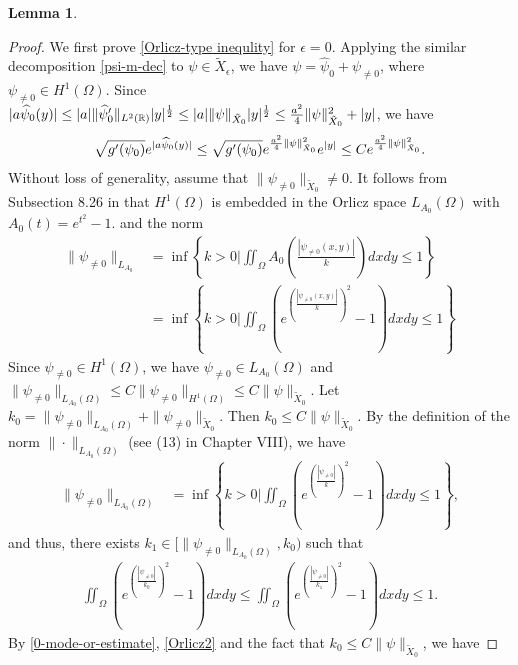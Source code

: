 \documentclass[1 [leqno, 11pt]{amsart}
\numberwithin{equation}{section}
\let\ep=\epsilon
\newtheorem{lemma}[Theorem]{Lemma}
\begin{document}
\begin{CJK*}{GBK}{song}
\begin{lemma}
\end{lemma}
\begin{proof} We first prove \eqref{Orlicz-type inequlity} for $\ep=0$.
Applying the similar decomposition \eqref{psi-m-dec} to $\psi \in \tilde{X}_\ep$, we have $\psi = \widehat\psi_0 +\psi_{\neq0}$, where
 $\psi_{\neq0} \in H^1(\Omega)$. Since $|a\widehat\psi_0(y)| \leq|a|\|\widehat\psi_0'\|_{L^2(\mathbb{R})}|y|^{\frac 1 2}\leq |a|\|\psi\|_{\tilde{X}_0}|y|^{\frac 1 2}\leq{a^2\over4}\|\psi\|_{\tilde{X}_0}^2+|y|$, we have
\begin{align}\label{0-mode-or-estimate}
\sqrt{g'(\psi_0)} e^{|a\widehat\psi_0(y)|} \leq \sqrt{g'(\psi_0)} e^{{a^2\over4}\|\psi\|_{\tilde{X}_0}^2 } e^{|y|} \leq C e^{{a^2\over4}\|\psi\|_{\tilde{X}_0}^2 }. \end{align}
Without loss of generality, assume that $\|\psi_{\neq0}\|_{\tilde{X}_0} \neq 0$. It follows from Subsection 8.26 in \cite{Adams75} that $H^1(\Omega)$ is embedded in the Orlicz space $L_{A_0}(\Omega)$ with $A_0(t) = e^{t^2} - 1$.
and the norm
\begin{align*}
\|\psi_{\neq0}\|_{L_{A_0}} &= \inf \left \{ k > 0 | \iint_{\Omega} A_0(\frac{|\psi_{\neq0}(x,y)|}{k}) dx dy \leq 1 \right \} \\
&= \inf \left \{ k > 0 | \iint_{\Omega} \left( e^{\left (\frac{|\psi_{\neq0}(x,y)|}{k}\right)^2} - 1\right)dx dy \leq 1 \right \}
\end{align*}
\fi
Since $\psi_{\neq0} \in H^1(\Omega)$, we have
   $\psi_{\neq0} \in L_{A_0}(\Omega)$ and
$\|\psi_{\neq0}\|_{L_{A_0}(\Omega)} \leq C \|\psi_{\neq0}\|_{H^1(\Omega)} \leq C \|\psi\|_{\tilde{X}_0}.$
Let $k_0 = \|\psi_{\neq0}\|_{L_{A_0}(\Omega)} + \|\psi_{\neq0}\|_{\tilde{X}_0}$. Then $k_0 \leq C\|\psi\|_{\tilde{X}_0}$. By the definition of the norm $\|\cdot\|_{L_{A_0}(\Omega)}$ (see (13) in Chapter VIII), we have
\begin{align*}
\|\psi_{\neq0}\|_{L_{A_0}(\Omega)}
&= \inf \left \{ k > 0 \bigg| \iint_{\Omega} \left( e^{\left (\frac{|\psi_{\neq0}|}{k}\right)^2} - 1\right)dx dy \leq 1 \right \},
\end{align*}
and thus, there exists $k_1\in[\|\psi_{\neq0}\|_{L_{A_0}(\Omega)}, k_0)$ such that
\begin{align}\label{Orlicz2}
\iint_{\Omega} \left( e^{\left(\frac{|\psi_{\neq0}|}{k_0}\right)^2} - 1 \right)dx dy \leq \iint_{\Omega} \left( e^{\left(\frac{|\psi_{\neq0}|}{k_1}\right)^2} - 1 \right)dx dy \leq  1.\end{align}
By \eqref{0-mode-or-estimate}, \eqref{Orlicz2} and the fact that $k_0 \leq C\|\psi\|_{\tilde{X}_0}$, we have

\end{proof}
\end{CJK*}
\end{document}
